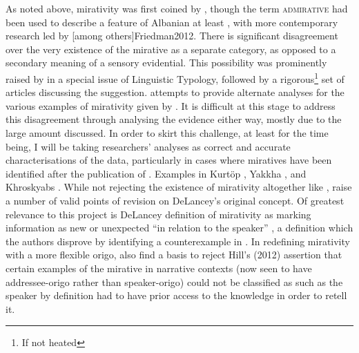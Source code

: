As noted above, mirativity was first coined by , though the term \textsc{admirative} had been used to describe a feature of Albanian at least , with more contemporary research led by [among others]{Friedman2012}. There is significant disagreement over the very existence of the mirative as a separate category, as opposed to a secondary meaning of a sensory evidential. This possibility was prominently raised by  in a special issue of Linguistic Typology, followed by a rigorous\footnote{If not heated} set of articles discussing the suggestion.  attempts to provide alternate analyses for the various examples of mirativity given by . It is difficult at this stage to address this disagreement through analysing the evidence either way, mostly due to the large amount discussed. In order to skirt this challenge, at least for the time being, I will be taking researchers' analyses as correct and accurate characterisations of the data, particularly in cases where miratives have been identified after the publication of . Examples in Kurtöp \cite[East Bodish, Bhutan][]{Hyslop2017}, Yakkha \cite[Kiranti, Nepal][]{Schackow2015}, and Khroskyabs \cites[Rgyalrongic, PRC][]{Lai2017}{TaylorAdams2020}. While not rejecting the existence of mirativity altogether like ,  raise a number of valid points of revision on DeLancey's original concept. Of greatest relevance to this project is DeLancey definition of mirativity as marking information as new or unexpected ``in relation to the speaker'' \cite[488]{HengeveldOlbertz2012}, a definition which the authors disprove by identifying a counterexample in . In redefining mirativity with a more flexible origo,  also find a basis to reject Hill's (2012) assertion that certain examples of the mirative in narrative contexts (now seen to have addressee-origo rather than speaker-origo) could not be classified as such as the speaker by definition had to have prior access to the knowledge in order to retell it.


